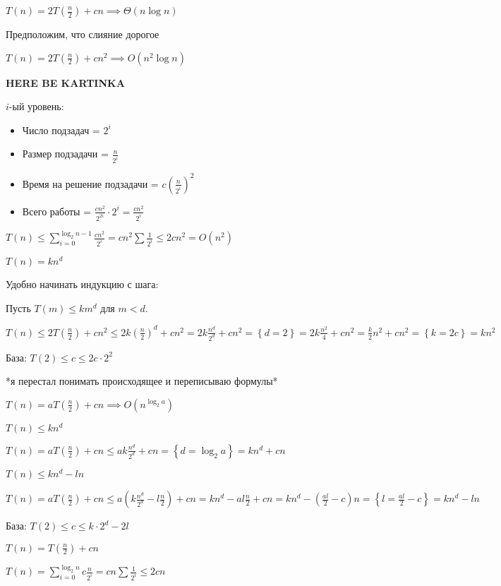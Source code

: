 \documentclass[11pt,a4paper]{article}
\begin{document}
$T(n) = 2T(\frac n2) + cn \implies \Theta(n\log n)$

Предположим, что слияние дорогое

$T(n) = 2T(\frac n2) + cn^2 \implies O(n^2 \log n)$

\vspace{1.5cm}
\textbf{HERE BE KARTINKA}
\vspace{1.5cm}

$i$-ый уровень:
\begin{itemize}
    \item Число подзадач = $2^i$
    \item Размер подзадачи = $\frac{n}{2^i}$
    \item Время на решение подзадачи = $c\left( \frac{n}{2^i} \right)^2$
    \item Всего работы = $\frac{cn^2}{2^{2i}}\cdot2^i = \frac{cn^2}{2^i}$
\end{itemize}

$T(n) \leqslant \sum\limits_{i=0}^{\log_2n-1}\frac{cn^2}{2^i} = cn^2 \sum \frac1{2^i} \leqslant2cn^2 = O(n^2)$

$T(n) = kn^d$

Удобно начинать индукцию с шага:

Пусть  $T(m)\leqslant km^d$ для $m<d$.

$T(n) \leqslant 2T(\frac n2) + cn^2 \leqslant 2k\left( \frac n2 \right)^d+cn^2 = 2k\frac{n^d}{2^d}+cn^2 = \left\{ d=2 \right\} = 2k\frac{n^2}{4} + cn^2 = \frac k2 n^2 + cn^2 = \left\{ k=2c \right\} = kn^2$

База: $T(2) \leqslant c \leqslant 2c\cdot2^2$

*я перестал понимать происходящее и переписываю формулы*

$T(n) = aT(\frac n2) + cn \implies O(n^{\log_2a})$

$T(n) \leqslant kn^d$

$T(n) = aT(\frac n2) + cn \leqslant ak \frac{n^d}{2^d}+cn = \left\{ d = \log_2a \right\} = kn^d + cn$

$T(n) \leqslant kn^d - ln$

$T(n) = aT(\frac n2) + cn \leqslant a\left(k \frac{n^d}{2^d}-l\frac n2\right)+cn = kn^d - al\frac n2 + cn = kn^d - \left( \frac{al}{2} - c \right)n = \left\{ l = \frac{al}{2} - c \right\} = kn^d - ln$

База: $T(2) \leqslant c \leqslant k\cdot 2^d - 2l$

$T(n) = T\left( \frac n2 \right) + cn$

$T(n) = \sum\limits_{i=0}^{\log_2n}c\frac{n}{2^i} = cn \sum\frac{1}{2^i} \leqslant 2cn$
\end{document}
